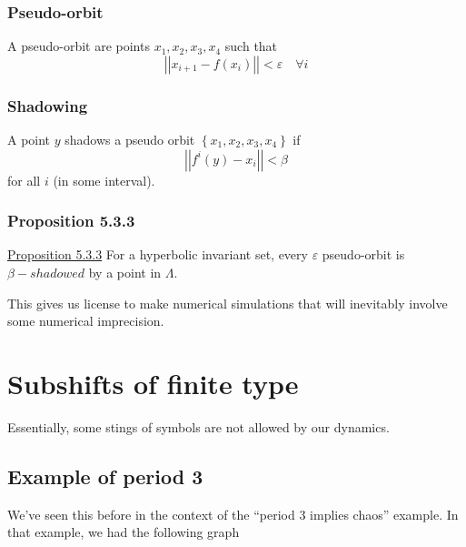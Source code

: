 \documentclass{article}
\begin{document}
\subsubsection{Pseudo-orbit}

A pseudo-orbit are points $x_1,x_2,x_3,x_4$ such that 
\[
\left|\left| x_{i+1} - f(x_i) \right|\right| < \varepsilon \quad \forall i
\]

\subsubsection{Shadowing}

A point $y$ shadows a pseudo orbit $\left\{x_1,x_2,x_3,x_4\right\}$ if 
\[
\left| \left| f^i(y) - x_i \right|\right|< \beta 
\]
for all $i$ (in some interval).

\subsubsection{Proposition 5.3.3}

\underline{Proposition 5.3.3} For a hyperbolic invariant set, every $\varepsilon$ pseudo-orbit is $\beta-shadowed$ by a point in $\Lambda$.

This gives us license to make numerical simulations that will inevitably involve some numerical imprecision.

\section{Subshifts of finite type}

Essentially, some stings of symbols are not allowed by our dynamics.

\subsection{Example of period 3}

We've seen this before in the context of the ``period 3 implies chaos'' example. In that example, we had the following graph

\end{document}
